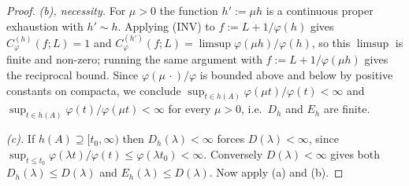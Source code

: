 \documentclass[10pt,a4paper]{amsart}
\begin{document}
\begin{proof}
\emph{(b), necessity.} For $\mu>0$ the function $h':=\mu h$ is a continuous proper
exhaustion with $h'\sim h$. Applying (INV) to $f:=L+1/\varphi(h)$ gives
$C^{(h)}_\varphi(f;L)=1$ and
$C^{(h')}_\varphi(f;L)=\limsup\varphi(\mu h)/\varphi(h)$, so this $\limsup$ is finite and
non-zero; running the same argument with $f:=L+1/\varphi(\mu h)$ gives the reciprocal
bound. Since $\varphi(\mu\,\cdot)/\varphi$ is bounded above and below by positive constants
on compacta, we conclude $\sup_{t\in h(A)}\varphi(\mu t)/\varphi(t)<\infty$ and
$\sup_{t\in h(A)}\varphi(t)/\varphi(\mu t)<\infty$ for every $\mu>0$, i.e.\ $D_h$ and
$E_h$ are finite.

\emph{(c).} If $h(A)\supseteq[t_0,\infty)$ then $D_h(\lambda)<\infty$ forces
$D(\lambda)<\infty$, since $\sup_{t\le t_0}\varphi(\lambda t)/\varphi(t)\le\varphi(\lambda t_0)<\infty$.
Conversely $D(\lambda)<\infty$ gives both $D_h(\lambda)\le D(\lambda)$ and
$E_h(\lambda)\le D(\lambda)$. Now apply (a) and (b).
\end{proof}
\end{document}
